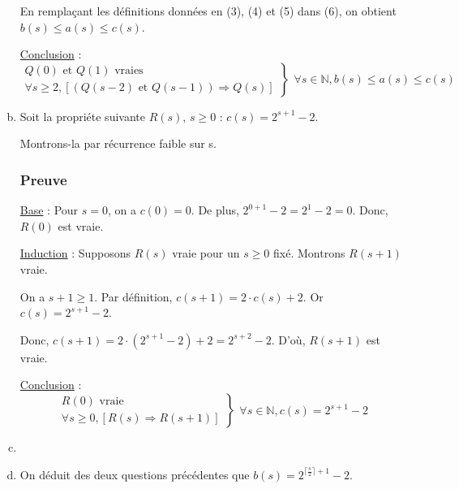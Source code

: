 \documentclass[12pt,a4paper]{article}
\begin{document}
\begin{enumerate}[a)]
En rempla\c{c}ant les d\'efinitions donn\'ees en (3), (4) et (5) dans (6), on obtient
$ b(s) \leq a(s) \leq c(s) $.

\underline{Conclusion} : 
\begin{equation*}
\left .\begin{array}{l}
Q(0) \text{ et } Q(1) \text{ vraies } \\
\forall s \geq 2, [(Q(s-2) \text{ et } Q(s-1)) \Rightarrow Q(s) ]
\end{array} \right \}
\left .\begin{array}{l}
\forall s \in \mathbb{N}, b(s) \leq a(s) \leq c(s)
\end{array}\right .
\end{equation*}

\item Soit la propri\'ete suivante \( R(s) \), $s \geq 0$ : $c(s) = 2^{s+1} - 2$.

Montrons-la par r\'ecurrence faible sur s.

\subsubsection*{Preuve}
\underline{Base} : Pour \( s = 0\), on a $c(0) = 0 $. De plus, $ 2^{0+1} - 2 = 2^1 - 2 = 0$. Donc, $R(0)$ est vraie.

\underline{Induction} : Supposons \( R(s) \) vraie pour un \( s \geq 0 \) fix\'e. Montrons \( R(s+1) \) vraie.

On a $ s+1 \geq 1 $. 
Par d\'efinition, $c(s+1) = 2\cdot c(s) + 2$. Or $c(s) = 2^{s+1} - 2$.

Donc, $c(s+1) = 2 \cdot (2^{s+1} - 2) + 2 = 2^{s+2} - 2$. D'o\`u, $R(s+1)$ est vraie.

\underline{Conclusion} : 
\begin{equation*}
\left .\begin{array}{l}
R(0) \text{ vraie } \\
\forall s \geq 0, [R(s) \Rightarrow R(s+1) ]
\end{array} \right \}
\left .\begin{array}{l}
\forall s \in \mathbb{N}, c(s) = 2^{s+1} - 2
\end{array}\right .
\end{equation*}

\item {}

\item On d\'eduit des deux questions pr\'ec\'edentes que $ b(s) = 2^{\lceil \frac{s}{2} \rceil + 1} - 2 $.


\end{enumerate}
\end{document}
